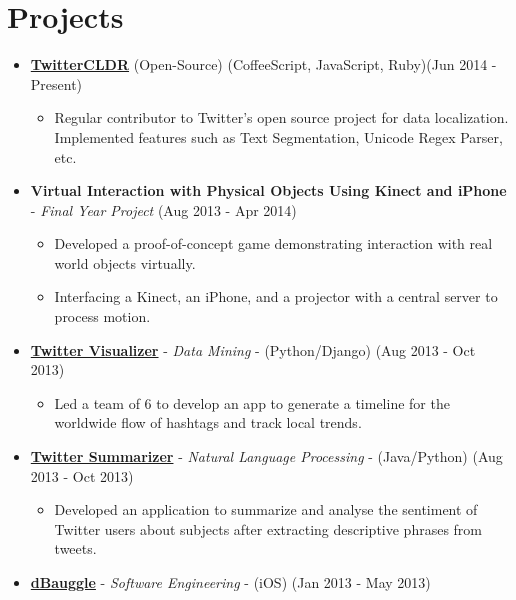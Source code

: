 \section{Projects}\label{projects}

\begin{itemize}
\tightlist
\item
  \href{https://github.com/twitter/twitter-cldr-js}{\textbf{TwitterCLDR}}
  (Open-Source) (CoffeeScript, JavaScript, Ruby)\hfill (Jun 2014 -
  Present)

  \begin{itemize}
  \tightlist
  \item
    Regular contributor to Twitter's open source project for data
    localization. Implemented features such as Text Segmentation,
    Unicode Regex Parser, etc.
  \end{itemize}
\item
  \textbf{Virtual Interaction with Physical Objects Using Kinect and
  iPhone} - \emph{Final Year Project} \hfill (Aug 2013 - Apr 2014)

  \begin{itemize}
  \tightlist
  \item
    Developed a proof-of-concept game demonstrating interaction with
    real world objects virtually.
  \item
    Interfacing a Kinect, an iPhone, and a projector with a central
    server to process motion.
  \end{itemize}
\item
  \href{https://github.com/radzinzki/Twitter-Visualiser}{\textbf{Twitter
  Visualizer}} - \emph{Data Mining} - (Python/Django) \hfill (Aug 2013 -
  Oct 2013)

  \begin{itemize}
  \tightlist
  \item
    Led a team of 6 to develop an app to generate a timeline for the
    worldwide flow of hashtags and track local trends.
  \end{itemize}
\item
  \href{https://github.com/radzinzki/NLP}{\textbf{Twitter Summarizer}} -
  \emph{Natural Language Processing} - (Java/Python) \hfill (Aug 2013 -
  Oct 2013)

  \begin{itemize}
  \tightlist
  \item
    Developed an application to summarize and analyse the sentiment of
    Twitter users about subjects after extracting descriptive phrases
    from tweets.
  \end{itemize}
\item
  \href{https://itunes.apple.com/us/app/dbauggle!/id625981185?mt=8}{\textbf{dBauggle}}
  - \emph{Software Engineering} - (iOS) \hfill (Jan 2013 - May 2013)


\end{itemize}
